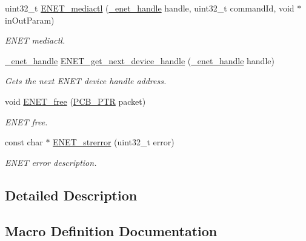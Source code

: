 \begin{DoxyCompactItemize}
uint32\+\_\+t \hyperlink{group__enet__rtcs__adaptor_ga1ee18c16767a687956c21428d1e5f98c}{E\+N\+E\+T\+\_\+mediactl} (\hyperlink{group__enet__rtcs__adaptor_gac8e61675abb18254042bf944bf122def}{\+\_\+enet\+\_\+handle} handle, uint32\+\_\+t command\+Id, void $\ast$in\+Out\+Param)
\begin{DoxyCompactList}\small\item\em E\+N\+ET mediactl. \end{DoxyCompactList}\item 
\hyperlink{group__enet__rtcs__adaptor_gac8e61675abb18254042bf944bf122def}{\+\_\+enet\+\_\+handle} \hyperlink{group__enet__rtcs__adaptor_ga3ad930b983f7e91c83890ab23b4228bd}{E\+N\+E\+T\+\_\+get\+\_\+next\+\_\+device\+\_\+handle} (\hyperlink{group__enet__rtcs__adaptor_gac8e61675abb18254042bf944bf122def}{\+\_\+enet\+\_\+handle} handle)
\begin{DoxyCompactList}\small\item\em Gets the next E\+N\+ET device handle address. \end{DoxyCompactList}\item 
void \hyperlink{group__enet__rtcs__adaptor_gac717fb40bf83cf75d23143341a2500c0}{E\+N\+E\+T\+\_\+free} (\hyperlink{structpcb}{P\+C\+B\+\_\+\+P\+TR} packet)
\begin{DoxyCompactList}\small\item\em E\+N\+ET free. \end{DoxyCompactList}\item 
const char $\ast$ \hyperlink{group__enet__rtcs__adaptor_gac292d4ebe834e18534e66405d63fe9ca}{E\+N\+E\+T\+\_\+strerror} (uint32\+\_\+t error)
\begin{DoxyCompactList}\small\item\em E\+N\+ET error description. \end{DoxyCompactList}\end{DoxyCompactItemize}


\subsection{Detailed Description}


\subsection{Macro Definition Documentation}
